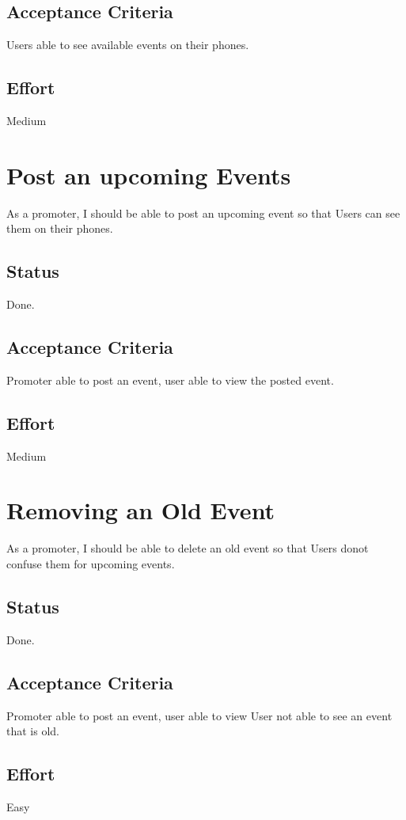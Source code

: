 \documentclass[10pt,a4paper]{article}
\begin{document}
\subsection{Acceptance Criteria}
Users able to see available events on their phones.
\subsection{Effort}
Medium

\section{Post an upcoming Events}
As a promoter, I should be able to post an upcoming event so that Users can see them on their phones.
\subsection{Status}
Done.
\subsection{Acceptance Criteria}
Promoter able to post an event, user able to view the posted event.
\subsection{Effort}
Medium

\section{Removing an Old Event}
As a promoter, I should be able to delete an old event so that Users donot confuse them for upcoming events.
\subsection{Status}
Done.
\subsection{Acceptance Criteria}
Promoter able to post an event, user able to view User not able to see an event that is old.
\subsection{Effort}
Easy
\end{document}

